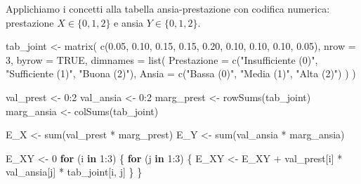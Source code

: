\documentclass[
  italian,
  letterpaper,
  a4paper,
  11pt,
  open=any]{scrbook}
\newenvironment{Shaded}{\begin{snugshade}}{\end{snugshade}}
\newcommand{\AttributeTok}[1]{\textcolor[rgb]{0.40,0.45,0.13}{#1}}
\newcommand{\ConstantTok}[1]{\textcolor[rgb]{0.56,0.35,0.01}{#1}}
\newcommand{\ControlFlowTok}[1]{\textcolor[rgb]{0.00,0.23,0.31}{\textbf{#1}}}
\newcommand{\DecValTok}[1]{\textcolor[rgb]{0.68,0.00,0.00}{#1}}
\newcommand{\FloatTok}[1]{\textcolor[rgb]{0.68,0.00,0.00}{#1}}
\newcommand{\FunctionTok}[1]{\textcolor[rgb]{0.28,0.35,0.67}{#1}}
\newcommand{\NormalTok}[1]{\textcolor[rgb]{0.00,0.23,0.31}{#1}}
\newcommand{\OtherTok}[1]{\textcolor[rgb]{0.00,0.23,0.31}{#1}}
\newcommand{\SpecialCharTok}[1]{\textcolor[rgb]{0.37,0.37,0.37}{#1}}
\newcommand{\StringTok}[1]{\textcolor[rgb]{0.13,0.47,0.30}{#1}}
\theoremstyle{plain}
\theoremstyle{definition}
\theoremstyle{definition}
\theoremstyle{remark}
\begin{document}
\begin{tcolorbox}[enhanced jigsaw, arc=.35mm, bottomrule=.15mm, bottomtitle=1mm, breakable, colback=white, colbacktitle=quarto-callout-note-color!10!white, colframe=quarto-callout-note-color-frame, coltitle=black, left=2mm, leftrule=.75mm, opacityback=0, opacitybacktitle=0.6, rightrule=.15mm, title=\textcolor{quarto-callout-note-color}{\faInfo}\hspace{0.5em}{Esempio: calcolo dalla tabella congiunta}, titlerule=0mm, toprule=.15mm, toptitle=1mm]

Applichiamo i concetti alla tabella ansia-prestazione con codifica
numerica: prestazione \(X \in \{0,1,2\}\) e ansia \(Y \in \{0,1,2\}\).

\begin{Shaded}
\begin{Highlighting}[]
\NormalTok{tab\_joint }\OtherTok{\textless{}{-}} \FunctionTok{matrix}\NormalTok{(}
  \FunctionTok{c}\NormalTok{(}\FloatTok{0.05}\NormalTok{, }\FloatTok{0.10}\NormalTok{, }\FloatTok{0.15}\NormalTok{,}
    \FloatTok{0.15}\NormalTok{, }\FloatTok{0.20}\NormalTok{, }\FloatTok{0.10}\NormalTok{,}
    \FloatTok{0.10}\NormalTok{, }\FloatTok{0.10}\NormalTok{, }\FloatTok{0.05}\NormalTok{),}
  \AttributeTok{nrow =} \DecValTok{3}\NormalTok{, }\AttributeTok{byrow =} \ConstantTok{TRUE}\NormalTok{,}
  \AttributeTok{dimnames =} \FunctionTok{list}\NormalTok{(}
    \AttributeTok{Prestazione =} \FunctionTok{c}\NormalTok{(}\StringTok{"Insufficiente (0)"}\NormalTok{, }\StringTok{"Sufficiente (1)"}\NormalTok{, }\StringTok{"Buona (2)"}\NormalTok{),}
    \AttributeTok{Ansia =} \FunctionTok{c}\NormalTok{(}\StringTok{"Bassa (0)"}\NormalTok{, }\StringTok{"Media (1)"}\NormalTok{, }\StringTok{"Alta (2)"}\NormalTok{)}
\NormalTok{  )}
\NormalTok{)}

\NormalTok{val\_prest }\OtherTok{\textless{}{-}} \DecValTok{0}\SpecialCharTok{:}\DecValTok{2}
\NormalTok{val\_ansia }\OtherTok{\textless{}{-}} \DecValTok{0}\SpecialCharTok{:}\DecValTok{2}
\NormalTok{marg\_prest }\OtherTok{\textless{}{-}} \FunctionTok{rowSums}\NormalTok{(tab\_joint)}
\NormalTok{marg\_ansia }\OtherTok{\textless{}{-}} \FunctionTok{colSums}\NormalTok{(tab\_joint)}

\NormalTok{E\_X }\OtherTok{\textless{}{-}} \FunctionTok{sum}\NormalTok{(val\_prest }\SpecialCharTok{*}\NormalTok{ marg\_prest)}
\NormalTok{E\_Y }\OtherTok{\textless{}{-}} \FunctionTok{sum}\NormalTok{(val\_ansia }\SpecialCharTok{*}\NormalTok{ marg\_ansia)}

\NormalTok{E\_XY }\OtherTok{\textless{}{-}} \DecValTok{0}
\ControlFlowTok{for}\NormalTok{ (i }\ControlFlowTok{in} \DecValTok{1}\SpecialCharTok{:}\DecValTok{3}\NormalTok{) \{}
  \ControlFlowTok{for}\NormalTok{ (j }\ControlFlowTok{in} \DecValTok{1}\SpecialCharTok{:}\DecValTok{3}\NormalTok{) \{}
\NormalTok{    E\_XY }\OtherTok{\textless{}{-}}\NormalTok{ E\_XY }\SpecialCharTok{+}\NormalTok{ val\_prest[i] }\SpecialCharTok{*}\NormalTok{ val\_ansia[j] }\SpecialCharTok{*}\NormalTok{ tab\_joint[i, j]}
\NormalTok{  \}}
\NormalTok{\}}


\end{Highlighting}
\end{Shaded}
\end{tcolorbox}
\end{document}
